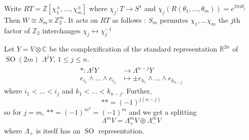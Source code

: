 \documentclass[11pt,a4paper]{scrarticle}
\theoremstyle{definition}
\theoremstyle{greenbox}
\newcommand{\R}{\mathbb{R}}
\newcommand{\Z}{\mathbb{Z}}
\newcommand{\C}{\mathbb{C}}
\begin{document}
\begin{example}
     Write $ RT = \Z[\chi_{1}^{\pm}, \dots, \chi_{m}^{\pm}] $ where $ \chi_{j}: T \to S^{1} $ and $ \chi_{j}(R(\theta_{1}, \dots, \theta_{m})) = e^{2 \pi i \theta_{j}} $
     Then $ W \cong S_{m} \ltimes \Z_{2}^{m} $. It acts on $ RT $ as follows : $ S_{m}$  permutes $ \chi_{1}, \dots \chi_{m} $ the $ j $th factor of $ \Z_{2} $ interchanges $ \chi_{j} \longleftrightarrow \chi_{j}^{-1} $
\end{example}
Let $ Y = V \otimes \C $ be the complexification of the standard representation $ \R^{2n} $ of $ \operatorname{SO}(2m) $ $ \Lambda^{j} Y $, $ 1 \le j \le n $. \begin{align*}
    * : \Lambda^{j} Y & \to \Lambda^{n-j}Y \\
    e_{i_{1}} \wedge \dots \wedge e_{i_{j}} & \mapsto \pm e_{k_{1}} \wedge \dots \wedge e_{k_{n-j}}
\end{align*}
where $ i_{1}< \dots < i_{j} $ and $ k_{1} < \dots < k_{n-j} $. Further, 
\[ ** = (-1)^{j(n-j)} \]
so for $ j=m $, $ ** = (-1)^{m^{2}} = (-1)^{m} $ and we get a splitting 
\[ \Lambda^{m}V = \Lambda_{+}^{m}V \oplus \Lambda_{-}^{m}V \]
where $ \Lambda_{+} $ is itself has an $ \operatorname{SO} $ representation. 
\end{document}
